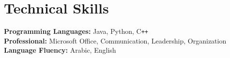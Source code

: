 
\section{Technical Skills}
 \begin{itemize}[leftmargin=0.15in, label={}]
    \small{\item{
      \textbf{Programming Languages: }{Java, Python, C\texttt{++}} \\
      \vspace{2pt}
      \textbf{Professional: }{Microsoft Office, Communication, Leadership, Organization} \\
      \vspace{2pt}
      \textbf{Language Fluency: }{Arabic, English}
    }}
 \end{itemize}
